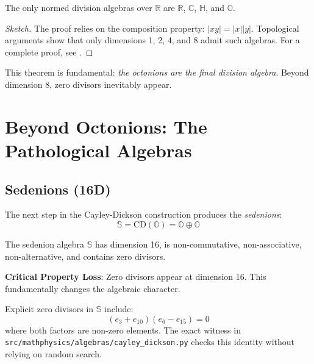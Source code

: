 \begin{theorem}
The only normed division algebras over $\mathbb{R}$ are $\mathbb{R}$, $\mathbb{C}$, $\mathbb{H}$, and $\mathbb{O}$.
\end{theorem}

\begin{proof}[Sketch]
The proof relies on the composition property: $|xy| = |x||y|$. Topological arguments show that only dimensions 1, 2, 4, and 8 admit such algebras. For a complete proof, see \cite{hurwitz1898komposition}.
\end{proof}

This theorem is fundamental: \textit{the octonions are the final division algebra}. Beyond dimension 8, zero divisors inevitably appear.

\section{Beyond Octonions: The Pathological Algebras}

\subsection{Sedenions (16D)}

The next step in the Cayley-Dickson construction produces the \textit{sedenions}:
\begin{equation}
    \mathbb{S} = \mathrm{CD}(\mathbb{O}) = \mathbb{O} \oplus \mathbb{O}
\end{equation}

\begin{theorem}
The sedenion algebra $\mathbb{S}$ has dimension 16, is non-commutative, non-associative, non-alternative, and contains zero divisors.
\end{theorem}

\textbf{Critical Property Loss}: Zero divisors appear at dimension 16. This fundamentally changes the algebraic character.

\begin{example}
Explicit zero divisors in $\mathbb{S}$ include:
\begin{equation}
    (e_3 + e_{10})(e_6 - e_{15}) = 0
\end{equation}
where both factors are non-zero elements. The exact witness in \texttt{src/mathphysics/algebras/cayley\_dickson.py} checks this identity without relying on random search.
\end{example}

